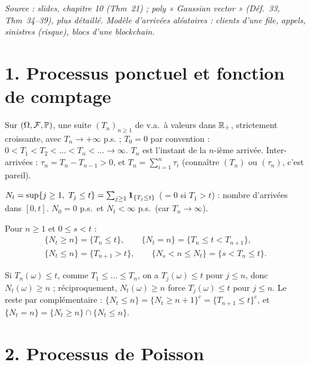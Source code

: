 \documentclass[11pt,a4paper]{article}
\begin{document}

\textit{Source : slides, chapitre 10 (Thm~21) ; poly « Gaussian vector » (Déf.~33, Thm~34--39), plus détaillé.
Modèle d'arrivées aléatoires : clients d'une file, appels, sinistres (risque), blocs d'une blockchain.}

\section*{1. Processus ponctuel et fonction de comptage}

\begin{definition}\label{C9:ponctuel}
Sur $(\Omega,\mathcal{F},\mathbb{P})$, une suite $(T_n)_{n\ge1}$ de v.a.\ à valeurs dans $\mathbb{R}_+$, strictement croissante, avec $T_n\to+\infty$ p.s. ;
$T_0=0$ par convention : $0<T_1<T_2<\dots<T_n<\dots\to\infty$. $T_n$ est l'instant de la $n$-ième arrivée.
Inter-arrivées : $\tau_n=T_n-T_{n-1}>0$, et $T_n=\sum_{i=1}^n\tau_i$ (connaître $(T_n)$ ou $(\tau_n)$, c'est pareil).
\end{definition}

\begin{definition}\label{C9:comptage}
$N_t=\sup\{j\ge1,\ T_j\le t\}=\sum_{j\ge1}\mathbf{1}_{\{T_j\le t\}}$ ($=0$ si $T_1>t$) : nombre d'arrivées dans $[0,t]$.
$N_0=0$ p.s.\ et $N_t<\infty$ p.s.\ (car $T_n\to\infty$).
\end{definition}

\begin{proposition}\label{C9:dico}
Pour $n\ge1$ et $0\le s<t$ :
\begin{gather*}\{N_t\ge n\}=\{T_n\le t\},\qquad \{N_t=n\}=\{T_n\le t<T_{n+1}\},\\
\{N_t\le n\}=\{T_{n+1}>t\},\qquad \{N_s<n\le N_t\}=\{s<T_n\le t\}.\end{gather*}
\end{proposition}
\begin{idee}
Si $T_n(\omega)\le t$, comme $T_1\le\dots\le T_n$, on a $T_j(\omega)\le t$ pour $j\le n$, donc $N_t(\omega)\ge n$ ; réciproquement,
$N_t(\omega)\ge n$ force $T_j(\omega)\le t$ pour $j\le n$. Le reste par complémentaire :
$\{N_t\le n\}=\{N_t\ge n+1\}^c=\{T_{n+1}\le t\}^c$, et $\{N_t=n\}=\{N_t\ge n\}\cap\{N_t\le n\}$.
\end{idee}

\section*{2. Processus de Poisson}
\end{document}

